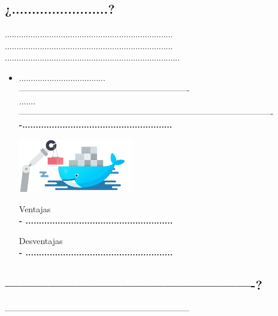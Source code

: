 \documentclass[twoside,twocolumn]{article}
\begin{document}
\subsection{¿........................?}

........................................................................\\
........................................................................\\
...........................................................................

\begin{itemize}
\item .....................................
\\ -------------------------------------------------------------
\\.......
\\-------------------------------------------------------------------------------------------
\\ \textbf{-........................................................}


\begin{center}
	\includegraphics[width=5cm]{./Imagenes/docker} 
	\end{center}

Ventajas
\\ \textbf{- .......................................................}
 
Desventajas
\\ \textbf{- .......................................................}
\end{itemize} 

\subsection{----------------------------------------------------?}
------------------------------------------------------------------
\end{document}

